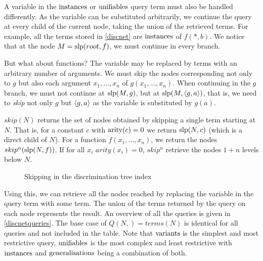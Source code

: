 A variable in the $\mathrm{instances}$ or $\mathrm{unifiables}$ query term must also be handled differently. As the variable can be substituted arbitrarily, we continue the query at every child of the current node, taking the union of the retrieved terms. For example, all the terms stored in \cref{discnet} are $\mathrm{instances}$ of $f(*,b)$. We notice that at the node $M = \mathrm{slp}(root,f)$, we must continue in every branch.

But what about functions? The variable may be replaced by terms with an arbitrary number of arguments. We must skip the nodes corresponding not only to $g$ but also each argument $x_{1}, \dots, x_{n}$ of $g(x_{1},\dots,x_{n})$. When continuing in the $g$ branch, we must not continue at $\mathrm{slp}(M,g)$, but at $\mathrm{slp}(M,\langle g,a \rangle)$, that is, we need to \emph{skip} not only $g$ but $\langle g, a \rangle$ as the variable is substituted by $g(a)$.

\begin{defn}
  $skip(N)$ returns the set of nodes obtained by skipping a single term starting at $N$. That is, for a constant $c$ with $\mathrm{arity}(c) = 0$ we return $\mathrm{slp}(N,c)$ (which is a direct child of $N$). For a function $f(x_{1},\dots,x_{n})$, we return the nodes $skip^n(\mathrm{slp}(N,f))$. If for all $x_{i}$ $arity(x_{i}) = 0$, $skip^n$ retrieve the nodes $1 + n$ levels below $N$.
\end{defn}

\begin{figure}[h]
  \centering
{}
  \caption{Skipping in the discrimination tree index} \label{discnetskip}
\end{figure}


Using this, we can retrieve all the nodes reached by replacing the variable in the query term with some term. The union of the terms returned by the query on each node represents the result. An overview of all the queries is given in \cref{discnetqueries}. The base case of $Q(N,\ang{}) = terms(N)$ is identical for all queries and not included in the table. Note that $\mathrm{variants}$ is the simplest and most restrictive query, $\mathrm{unifiables}$ is the most complex and least restrictive with $\mathrm{instances}$ and $\mathrm{generalisations}$ being a combination of both.


